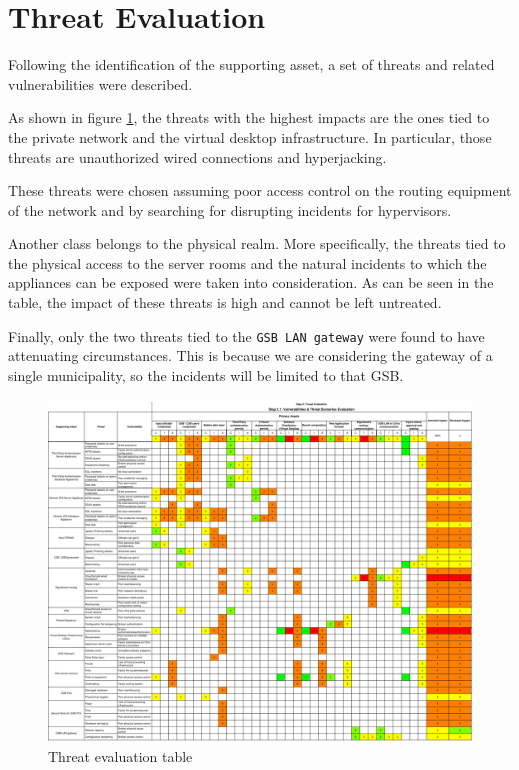 \section*{Threat Evaluation}

Following the identification of the supporting asset, a set of threats and related vulnerabilities were described. 

As shown in figure \ref{fig:threatsEval}, the threats with the highest impacts are the ones tied to the private network and the virtual desktop infrastructure. In particular, those threats are unauthorized wired connections and hyperjacking\cite{online:hyperjacking}. 

These threats were chosen assuming poor access control on the routing equipment of the network and by searching for disrupting incidents for hypervisors. 

Another class belongs to the physical realm. More specifically, the threats tied to the physical access to the server rooms and the natural incidents to which the appliances can be exposed were taken into consideration. As can be seen in the table, the impact of these threats is high and cannot be left untreated.

Finally, only the two threats tied to the \texttt{GSB LAN gateway} were found to have attenuating circumstances. This is because we are considering the gateway of a single municipality, so the incidents will be limited to that GSB.

\begin{figure}[h!]
    \centering
    \includegraphics[keepaspectratio,width=1\textwidth]{03-risk-analysis/003-TE/img/threatEval.pdf}
    \caption{Threat evaluation table}
    \label{fig:threatsEval}
\end{figure}

